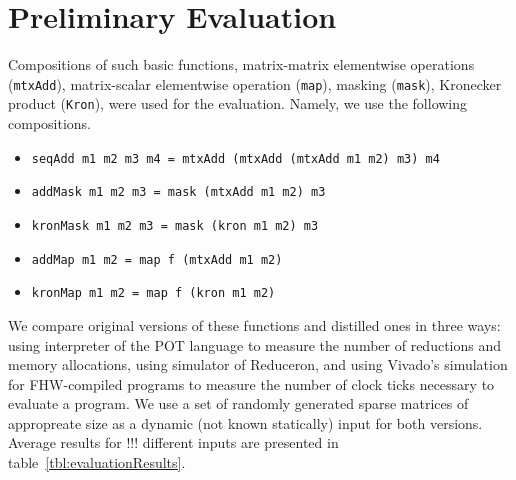 \section{Preliminary Evaluation}

Compositions of such basic functions, matrix-matrix elementwise operations (\verb|mtxAdd|), matrix-scalar elementwise operation (\verb|map|), masking (\verb|mask|), Kronecker product (\verb|Kron|), were used for the evaluation.
Namely, we use the following compositions.
\begin{itemize}
     \item \verb|seqAdd m1 m2 m3 m4 = mtxAdd (mtxAdd (mtxAdd m1 m2) m3) m4|
     \item \verb|addMask m1 m2 m3 = mask (mtxAdd m1 m2) m3 |  
     \item \verb|kronMask m1 m2 m3 = mask (kron m1 m2) m3 |  
     \item \verb|addMap m1 m2 = map f (mtxAdd m1 m2)|  
     \item \verb|kronMap m1 m2 = map f (kron m1 m2)|  
\end{itemize}
We compare original versions of these functions and distilled ones in three ways: using interpreter of the POT language to measure the number of reductions and memory allocations, using simulator of Reduceron, and using Vivado's simulation for FHW-compiled programs to measure the number of clock ticks necessary to evaluate a program.
We use a set of randomly generated sparse matrices of appropreate size as a dynamic (not known statically) input for both versions.
Average results for !!! different inputs are presented in table~\ref{tbl:evaluationResults}. 


